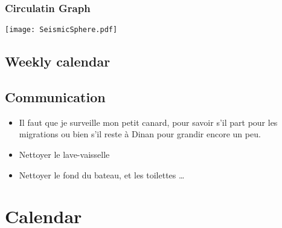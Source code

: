 \documentclass[8pt]{article} %
\begin{document}
\subsubsection{Circulatin Graph}
\texttt{[image: SeismicSphere.pdf]}


%

%

%

%

\subsection{Weekly calendar}


\subsection{Communication}
\begin{itemize}
  \item Il faut que je surveille mon petit canard, pour savoir s'il part pour les migrations ou bien s'il reste à Dinan pour grandir encore un peu.
  \item Nettoyer le lave-vaisselle
  \item Nettoyer le fond du bateau, et les toilettes \ldots
\end{itemize}

\section{Calendar}
\end{document}
